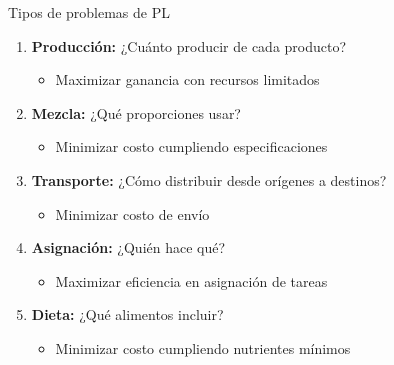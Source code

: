 \documentclass[aspectratio=169,10pt]{beamer}
\begin{document}
\begin{frame}{Tipos de problemas de PL}

\begin{enumerate}
    \item \textbf{Producción:} ¿Cuánto producir de cada producto?
    \begin{itemize}
        \item Maximizar ganancia con recursos limitados
    \end{itemize}

    \vspace{0.2cm}

    \item \textbf{Mezcla:} ¿Qué proporciones usar?
    \begin{itemize}
        \item Minimizar costo cumpliendo especificaciones
    \end{itemize}

    \vspace{0.2cm}

    \item \textbf{Transporte:} ¿Cómo distribuir desde orígenes a destinos?
    \begin{itemize}
        \item Minimizar costo de envío
    \end{itemize}

    \vspace{0.2cm}

    \item \textbf{Asignación:} ¿Quién hace qué?
    \begin{itemize}
        \item Maximizar eficiencia en asignación de tareas
    \end{itemize}

    \vspace{0.2cm}

    \item \textbf{Dieta:} ¿Qué alimentos incluir?
    \begin{itemize}
        \item Minimizar costo cumpliendo nutrientes mínimos
    \end{itemize}
\end{enumerate}

\end{frame}
\end{document}
